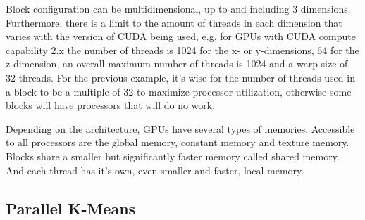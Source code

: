 Block configuration can be multidimensional, up to and including 3 dimensions. Furthermore, there is a limit to the amount of threads in each dimension that varies with the version of CUDA being used, e.g. for GPUs with CUDA compute capability 2.x  the number of threads is 1024 for the x- or y-dimensions, 64 for the z-dimension, an overall maximum number of threads is 1024 and a warp size of 32 threads. For the previous example, it's wise for the number of threads used in a block to be a multiple of 32 to maximize processor utilization, otherwise some blocks will have processors that will do no work.

Depending on the architecture, GPUs have several types of memories. Accessible to all processors are the global memory, constant memory and texture memory. Blocks share a smaller but significantly faster memory called shared memory. And each thread has it's own, even smaller and faster, local memory.








\subsection{Parallel K-Means}


